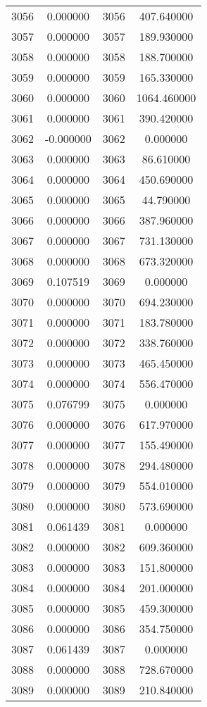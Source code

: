 \documentclass[12pt]{article}
\begin{document}
\begin{longtable}{@{}cccc@{}}
3056 & 0.000000 & 3056 & 407.640000 \\
3057 & 0.000000 & 3057 & 189.930000 \\
3058 & 0.000000 & 3058 & 188.700000 \\
3059 & 0.000000 & 3059 & 165.330000 \\
3060 & 0.000000 & 3060 & 1064.460000 \\
3061 & 0.000000 & 3061 & 390.420000 \\
3062 & -0.000000 & 3062 & 0.000000 \\
3063 & 0.000000 & 3063 & 86.610000 \\
3064 & 0.000000 & 3064 & 450.690000 \\
3065 & 0.000000 & 3065 & 44.790000 \\
3066 & 0.000000 & 3066 & 387.960000 \\
3067 & 0.000000 & 3067 & 731.130000 \\
3068 & 0.000000 & 3068 & 673.320000 \\
3069 & 0.107519 & 3069 & 0.000000 \\
3070 & 0.000000 & 3070 & 694.230000 \\
3071 & 0.000000 & 3071 & 183.780000 \\
3072 & 0.000000 & 3072 & 338.760000 \\
3073 & 0.000000 & 3073 & 465.450000 \\
3074 & 0.000000 & 3074 & 556.470000 \\
3075 & 0.076799 & 3075 & 0.000000 \\
3076 & 0.000000 & 3076 & 617.970000 \\
3077 & 0.000000 & 3077 & 155.490000 \\
3078 & 0.000000 & 3078 & 294.480000 \\
3079 & 0.000000 & 3079 & 554.010000 \\
3080 & 0.000000 & 3080 & 573.690000 \\
3081 & 0.061439 & 3081 & 0.000000 \\
3082 & 0.000000 & 3082 & 609.360000 \\
3083 & 0.000000 & 3083 & 151.800000 \\
3084 & 0.000000 & 3084 & 201.000000 \\
3085 & 0.000000 & 3085 & 459.300000 \\
3086 & 0.000000 & 3086 & 354.750000 \\
3087 & 0.061439 & 3087 & 0.000000 \\
3088 & 0.000000 & 3088 & 728.670000 \\
3089 & 0.000000 & 3089 & 210.840000 \\

\end{longtable}
\end{document}
